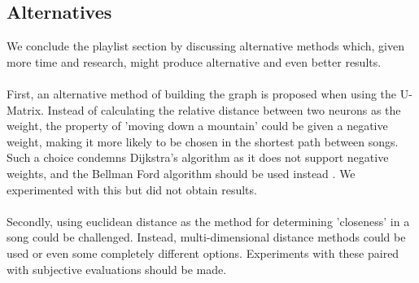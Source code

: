 \subsection{Alternatives}

We conclude the playlist section by discussing alternative methods which, given more time and research, might produce 
alternative and even better results.
\\\\
First, an alternative method of building the graph is proposed when using the U-Matrix. Instead of calculating the relative distance between two neurons as the weight, the property of 'moving down a mountain' could be given a negative weight, making it more likely to be chosen in the shortest path between songs. Such a choice condemns Dijkstra's algorithm as it does not support negative weights, and the Bellman Ford algorithm should be used instead \citep{algs4}. We experimented with this but did not obtain results.
\\\\
Secondly, using euclidean distance as the method for determining 'closeness' in a song could be challenged. Instead, multi-dimensional distance methods could be used or even some completely different options. Experiments with these paired with subjective evaluations should be made.




